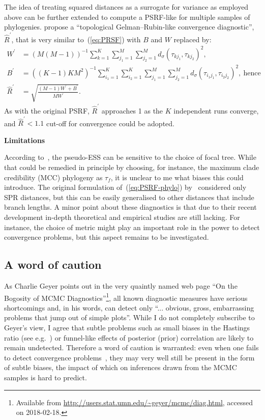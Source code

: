 The idea of treating squared distances as a surrogate for variance as employed above can be further extended to compute a PSRF-like for multiple samples of phylogenies.
\cite{Whidden2015} propose a ``topological Gelman--Rubin-like convergence diagnostic'', $\hat{R}^\prime$, that is very similar to~(\ref{eq:PRSF}) with $B$ and $W$ replaced by:
\begin{align}
 W^\prime &= \left(M(M-1)\right)^{-1}\sum_{k =1}^K\sum_{j_1 = 1}^M\sum_{j_2 = 1}^M d_\sigma(\tau_{kj_1}, \tau_{kj_2})^2,\\
 B^\prime &= \left((K-1)KM^2\right)^{-1} \sum_{i_1 = 1}^K\sum_{i_2 = 1}^K\sum_{j_1 = 1}^M \sum_{j_2 = 1}^M d_\sigma(\tau_{i_1j_1}, \tau_{i_2j_2})^2,\: \text{hence}\\
 \label{eq:PSRF-phylo}
 \hat{R}^\prime &= \sqrt{\frac{ (M-1)W^\prime +  B^\prime }{MW^\prime}}.
\end{align}
As with the original PSRF, $\hat{R}^\prime$ approaches 1 as the $K$ independent runs converge, and $\hat{R}^\prime < 1.1$ cut-off for convergence could be adopted.

\textbf{Limitations}

According to~\cite{Lanfear2016}, the pseudo-ESS can be sensitive to the choice of focal tree.
While that could be remedied in principle by choosing, for instance, the maximum clade credibility (MCC) phylogeny as $\tau_f$, it is unclear to me what biases this could introduce.
The original formulation of~(\ref{eq:PSRF-phylo}) by~\cite{Whidden2015} considered only SPR distances, but this can be easily generalised to other distances that include branch lengths.
A minor point about these diagnostics is that due to their recent development in-depth theoretical and empirical studies are still lacking.
For instance, the choice of metric might play an important role in the power to detect convergence problems, but this aspect remains to be investigated.

\subsection{A word of caution}

As Charlie Geyer points out in the very quaintly named web page ``On the Bogosity of MCMC Diagnostics''\footnote{Available from \url{http://users.stat.umn.edu/~geyer/mcmc/diag.html}, accessed on 2018-02-18.}, all known diagnostic measures
have serious shortcomings and, in his words, can detect only ``... obvious, gross, embarrassing problems that jump out of simple plots''.
While I do not completely subscribe to Geyer's view,  I agree that subtle problems such as small biases in the Hastings ratio (see e.g.~\cite{Holder2005}) or funnel-like effects of posterior (prior) correlation are likely to remain undetected.
Therefore a word of caution is warranted: even when one fails to detect convergence problems~\citep{Cowles1999}, they may very well still be present in the form of subtle biases, the impact of which on inferences drawn from the MCMC samples is hard to predict.


